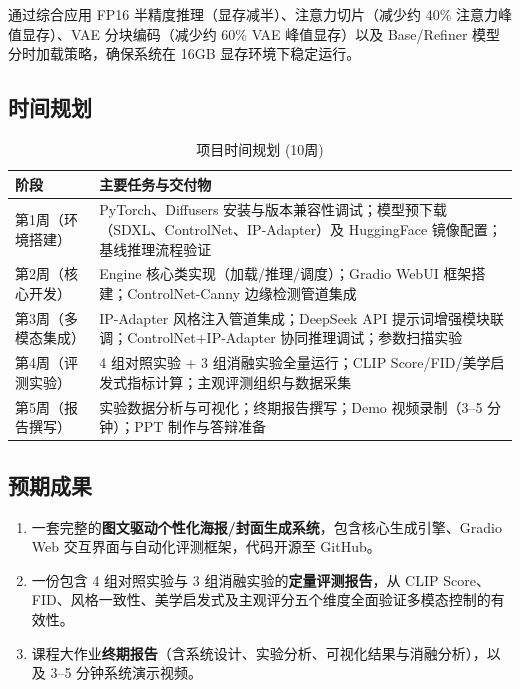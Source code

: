\documentclass[10pt,a4paper]{article}
\begin{document}
通过综合应用 FP16 半精度推理（显存减半）、注意力切片（减少约 40\% 注意力峰值显存）、VAE 分块编码（减少约 60\% VAE 峰值显存）以及 Base/Refiner 模型分时加载策略，确保系统在 16GB 显存环境下稳定运行。

\subsection{时间规划}

\begin{table}[H]
\centering
\caption{项目时间规划 (10周)}
\label{tab:timeline}
\begin{tabular}{@{}p{3cm} p{9.5cm}@{}}
\toprule
\textbf{阶段} & \textbf{主要任务与交付物} \\
\midrule
第1周（环境搭建） & PyTorch、Diffusers 安装与版本兼容性调试；模型预下载（SDXL、ControlNet、IP-Adapter）及 HuggingFace 镜像配置；基线推理流程验证 \\
第2周（核心开发） & Engine 核心类实现（加载/推理/调度）；Gradio WebUI 框架搭建；ControlNet-Canny 边缘检测管道集成 \\
第3周（多模态集成） & IP-Adapter 风格注入管道集成；DeepSeek API 提示词增强模块联调；ControlNet+IP-Adapter 协同推理调试；参数扫描实验 \\
第4周（评测实验） & 4 组对照实验 + 3 组消融实验全量运行；CLIP Score/FID/美学启发式指标计算；主观评测组织与数据采集 \\
第5周（报告撰写） & 实验数据分析与可视化；终期报告撰写；Demo 视频录制（3--5 分钟）；PPT 制作与答辩准备 \\
\bottomrule
\end{tabular}
\end{table}

\subsection{预期成果}

\begin{enumerate}[itemsep=0pt,topsep=2pt]
    \item 一套完整的\textbf{图文驱动个性化海报/封面生成系统}，包含核心生成引擎、Gradio Web 交互界面与自动化评测框架，代码开源至 GitHub。
    \item 一份包含 4 组对照实验与 3 组消融实验的\textbf{定量评测报告}，从 CLIP Score、FID、风格一致性、美学启发式及主观评分五个维度全面验证多模态控制的有效性。
    \item 课程大作业\textbf{终期报告}（含系统设计、实验分析、可视化结果与消融分析），以及 3--5 分钟系统演示视频。
\end{enumerate}
\end{document}
